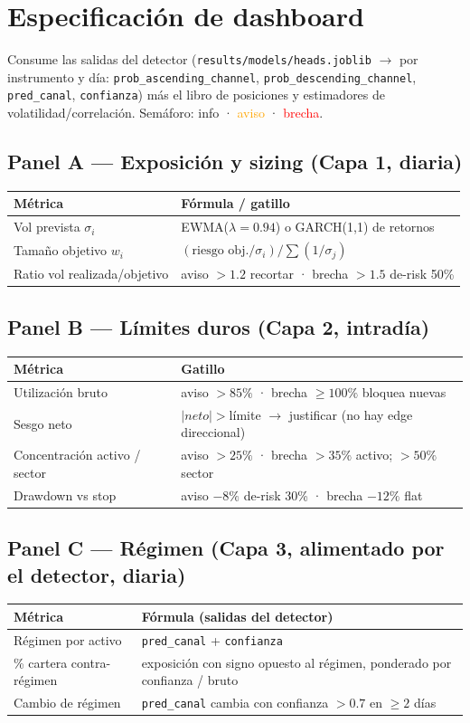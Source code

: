 \documentclass[11pt]{article}
\begin{document}
\section{Especificaci\'on de dashboard}
Consume las salidas del detector (\texttt{results/models/heads.joblib} $\to$ por instrumento
y d\'ia: \texttt{prob\_ascending\_channel}, \texttt{prob\_descending\_channel},
\texttt{pred\_canal}, \texttt{confianza}) m\'as el libro de posiciones y estimadores de
volatilidad/correlaci\'on. Sem\'aforo: \textcolor{cTealD}{info} · \textcolor{orange}{aviso} ·
\textcolor{red}{brecha}.

\subsection*{Panel A --- Exposici\'on y sizing (Capa 1, diaria)}
\begin{tabularx}{\textwidth}{L L}
\toprule \textbf{M\'etrica} & \textbf{F\'ormula / gatillo}\\ \midrule
Vol prevista $\sigma_i$ & EWMA($\lambda=0.94$) o GARCH(1,1) de retornos\\
Tama\~no objetivo $w_i$ & $(\text{riesgo obj.}/\sigma_i)/\sum(1/\sigma_j)$\\
Ratio vol realizada/objetivo & aviso $>1.2$ recortar · brecha $>1.5$ de-risk 50\%\\
\bottomrule
\end{tabularx}

\subsection*{Panel B --- L\'imites duros (Capa 2, intrad\'ia)}
\begin{tabularx}{\textwidth}{L L}
\toprule \textbf{M\'etrica} & \textbf{Gatillo}\\ \midrule
Utilizaci\'on bruto & aviso $>85\%$ · brecha $\geq 100\%$ bloquea nuevas\\
Sesgo neto & $|neto|>$l\'imite $\to$ justificar (no hay edge direccional)\\
Concentraci\'on activo / sector & aviso $>25\%$ · brecha $>35\%$ activo; $>50\%$ sector\\
Drawdown vs stop & aviso $-8\%$ de-risk 30\% · brecha $-12\%$ flat\\
\bottomrule
\end{tabularx}

\subsection*{Panel C --- R\'egimen (Capa 3, alimentado por el detector, diaria)}
\begin{tabularx}{\textwidth}{L L}
\toprule \textbf{M\'etrica} & \textbf{F\'ormula (salidas del detector)}\\ \midrule
R\'egimen por activo & \texttt{pred\_canal} + \texttt{confianza}\\
\% cartera contra-r\'egimen & exposici\'on con signo opuesto al r\'egimen, ponderado por confianza / bruto\\
Cambio de r\'egimen & \texttt{pred\_canal} cambia con confianza $>0.7$ en $\geq 2$ d\'ias\\
\bottomrule
\end{tabularx}
\end{document}
